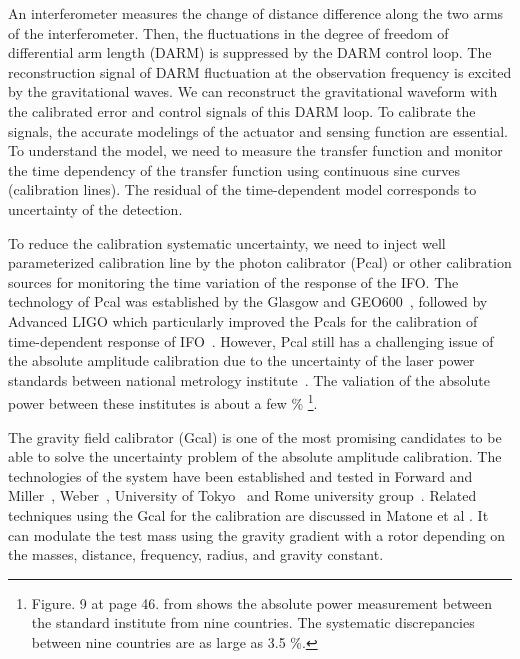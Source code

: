 \documentclass[%
 reprint,
superscriptaddress,
 amsmath,amssymb,
 aps,
]{revtex4-1}
\begin{document}

An interferometer measures the change of distance difference along the two arms of the interferometer. Then, the fluctuations in the degree of freedom of differential arm length (DARM) is suppressed by the DARM control loop. The reconstruction signal of DARM fluctuation at the observation frequency is excited by the gravitational waves. We can reconstruct the gravitational waveform with the calibrated error and control signals of this DARM loop. To calibrate the signals, the accurate modelings of the actuator and sensing function are essential. To understand the model, we need to measure the transfer function and monitor the time dependency of the transfer function using continuous sine curves (calibration lines). The residual of the time-dependent model corresponds to uncertainty of the detection.

To reduce the calibration systematic uncertainty, we need to inject well parameterized calibration line by the photon calibrator (Pcal) or other calibration sources for monitoring the time variation of the response of the IFO. The technology of Pcal was established by the Glasgow and GEO600~\cite{CLUBLEY200185,MOSSAVI20061}, followed by Advanced LIGO which particularly improved the Pcals for the calibration of time-dependent response of IFO~\cite{0264-9381-32-2-024001, doi:10.1063/1.4967303,0264-9381-27-8-084024,0264-9381-26-24-245011,0264-9381-32-2-024001}. However, Pcal still has a challenging issue of the absolute amplitude calibration due to the uncertainty of the laser power standards between national metrology institute~\cite{EUROMET}. The valiation of the absolute power between these institutes is about a few \% \footnote{Figure. 9 at page 46. from \cite{EUROMET} shows the absolute power measurement between the standard institute from nine countries. The systematic discrepancies between nine countries are as large as 3.5 \%.}.

The gravity field calibrator (Gcal) is one of the most promising candidates to be able to solve the uncertainty problem of the absolute amplitude calibration. The technologies of the system have been established and tested in Forward and Miller~\cite{doi:10.1063/1.1709366}, Weber~\cite{PhysRevLett.18.795,PhysRev.167.1145}, University of Tokyo~\cite{Hirakawa,1347-4065-19-3-L123,1347-4065-20-7-L498,PhysRevD.26.729,PhysRevD.32.342} and Rome university group~\cite{Astone1991}. Related techniques using the Gcal for the calibration are discussed in Matone et al \cite{0264-9381-24-9-005}. It can modulate the test mass using the gravity gradient with a rotor depending on the masses, distance, frequency, radius, and gravity constant. 
\end{document}
